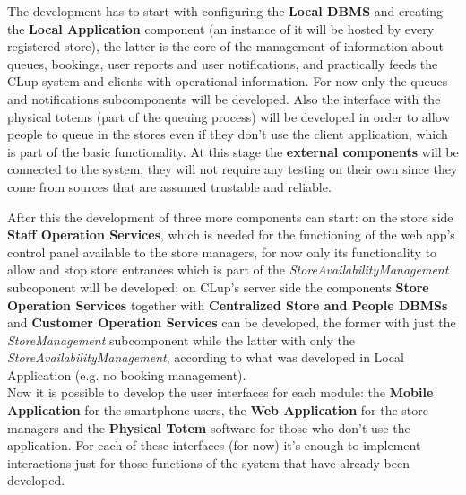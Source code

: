 The development has to start with configuring the \textbf{Local DBMS} and creating the \textbf{Local Application} component (an instance of it will be hosted by every registered store), the latter is the core of the management of information about queues, bookings, user reports and user notifications, and practically feeds the CLup system and clients with operational information. For now only the queues and notifications subcomponents will be developed. Also the interface with the physical totems (part of the queuing process) will be developed in order to allow people to queue in the stores even if they don’t use the client application, which is part of the basic functionality. At this stage the \textbf{external components} will be connected to the system, they will not require any testing on their own since they come from sources that are assumed trustable and reliable.

After this the development of three more components can start: on the store side \textbf{Staff Operation Services}, which is needed for the functioning of the web app’s control panel available to the store managers, for now only its functionality to allow and stop store entrances which is part of the \textit{StoreAvailabilityManagement} subcoponent will be developed; on CLup’s server side the components \textbf{Store Operation Services} together with \textbf{Centralized Store and People DBMSs} and \textbf{Customer Operation Services} can be developed, the former with just the \textit{StoreManagement} subcomponent while the latter with only the \textit{StoreAvailabilityManagement}, according to what was developed in Local Application (e.g. no booking management).\\

Now it is possible to develop the user interfaces for each module: the \textbf{Mobile Application} for the smartphone users, the \textbf{Web Application} for the store managers and the \textbf{Physical Totem} software for those who don’t use the application. For each of these interfaces (for now) it’s enough to implement interactions just for those functions of the system that have already been developed.\\


